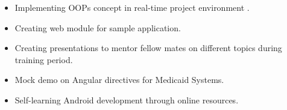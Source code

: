 \documentclass[10pt,a4paper,ragged2e]{altacv}
\begin{document}

\begin{fullwidth}
\makecvheader
\end{fullwidth}



\divider
\smallskip


\begin{itemize}
\item Implementing OOPs concept in real-time project environment .
\small
\item Creating web module for sample application. 
\small
\item Creating presentations to mentor fellow mates on different topics during training period.  
\end{itemize}
\divider

\smallskip
{}

\begin{itemize}
\item Mock demo on Angular directives for Medicaid Systems.
\small
\item Self-learning Android development through online resources. 
\end{itemize}
\divider
\small
\end{document}
